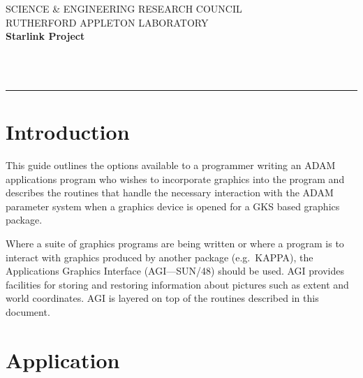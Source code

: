 \newcommand{\sstitem}{\item}



\thispagestyle{empty}
SCIENCE \& ENGINEERING RESEARCH COUNCIL \hfill \stardocname\\
RUTHERFORD APPLETON LABORATORY\\
{\large\bf Starlink Project\\}
{\large\bf \stardoccategory\ \stardocnumber}
\begin{flushright}
\stardocauthors\\
\stardocdate
\end{flushright}
\vspace{-4mm}
\rule{\textwidth}{0.5mm}
\vspace{5mm}
\begin{center}
{\Large\bf \stardoctitle}
\end{center}
\vspace{5mm}



\section{Introduction}

This guide outlines the options available to a programmer writing an ADAM
applications program who wishes to incorporate graphics into the program and
describes the routines that handle the necessary interaction with the ADAM 
parameter system when a graphics device is opened for a GKS based graphics
package.

Where a suite of graphics programs are being written or where a program is to
interact with graphics produced by another package (e.g.\ KAPPA), the
Applications Graphics Interface (AGI---SUN/48) should be used. AGI provides
facilities for storing and restoring information about pictures such as extent
and world coordinates. AGI is layered on top of the routines described in
this document.

\section{Application}

